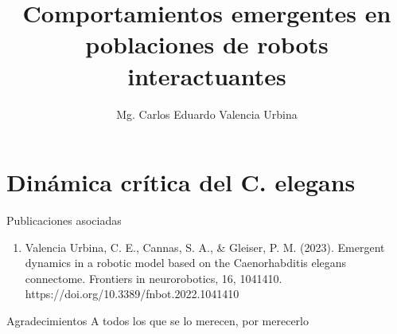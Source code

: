 \documentclass[12pt,screen,twoside,pagebackref]{ibtesis}
\title{Comportamientos emergentes en poblaciones de robots interactuantes}
\author{Mg. Carlos Eduardo Valencia Urbina}
\begin{document}

\begin{preliminary}




\tableofcontents                %

\listoffigures                  %

\listoftables                   %

\printunsrtglossaries %





\end{preliminary}






\part{Dinámica crítica del C. elegans}





\appendix


\begin{biblio}

\end{biblio}


\begin{postliminary}

\begin{seccion}{Publicaciones asociadas}
  \begin{enumerate}
  \item    Valencia Urbina, C. E., Cannas, S. A., \& Gleiser, P. M. (2023). Emergent dynamics in a robotic model based on the Caenorhabditis elegans connectome. Frontiers in neurorobotics, 16, 1041410. https://doi.org/10.3389/fnbot.2022.1041410
  
  \end{enumerate}
\end{seccion}

\begin{seccion}{Agradecimientos}
A todos los que se lo merecen, por merecerlo
\end{seccion}

\end{postliminary}
\end{document}
